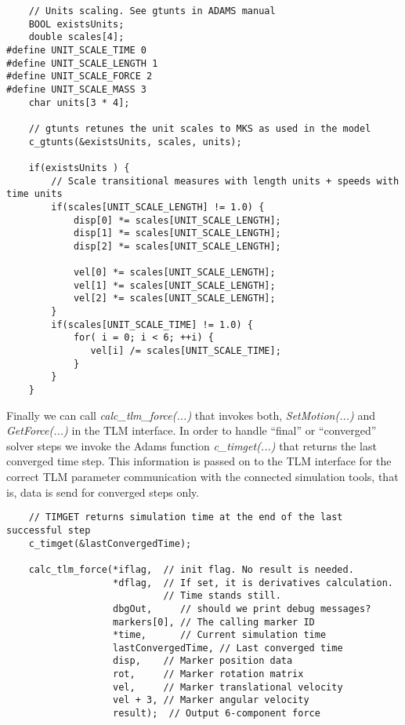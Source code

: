 {
\scriptsize
\begin{verbatim}
    // Units scaling. See gtunts in ADAMS manual
    BOOL existsUnits;
    double scales[4];
#define UNIT_SCALE_TIME 0
#define UNIT_SCALE_LENGTH 1
#define UNIT_SCALE_FORCE 2
#define UNIT_SCALE_MASS 3
    char units[3 * 4];

    // gtunts retunes the unit scales to MKS as used in the model
    c_gtunts(&existsUnits, scales, units);

    if(existsUnits ) {	
        // Scale transitional measures with length units + speeds with time units
        if(scales[UNIT_SCALE_LENGTH] != 1.0) {
            disp[0] *= scales[UNIT_SCALE_LENGTH];
            disp[1] *= scales[UNIT_SCALE_LENGTH];
            disp[2] *= scales[UNIT_SCALE_LENGTH];

            vel[0] *= scales[UNIT_SCALE_LENGTH];
            vel[1] *= scales[UNIT_SCALE_LENGTH];
            vel[2] *= scales[UNIT_SCALE_LENGTH];	
        }
        if(scales[UNIT_SCALE_TIME] != 1.0) {
            for( i = 0; i < 6; ++i) {
               vel[i] /= scales[UNIT_SCALE_TIME];
            }
        }
    }
\end{verbatim}
}

Finally we can call {\em calc\_tlm\_force(...)} that invokes both, {\em SetMotion(...)} and {\em GetForce(...)} in the TLM interface. 
In order to handle ``final'' or ``converged'' solver steps we invoke the Adams function {\em c\_timget(...)} that returns the last converged time step. 
This information is passed on to the TLM interface for the correct TLM parameter communication with the connected simulation tools, that is, data is send for converged steps only.

{
\scriptsize
\begin{verbatim}
    // TIMGET returns simulation time at the end of the last successful step
    c_timget(&lastConvergedTime);

    calc_tlm_force(*iflag,  // init flag. No result is needed.
                   *dflag,  // If set, it is derivatives calculation.
                            // Time stands still.
                   dbgOut,     // should we print debug messages?
                   markers[0], // The calling marker ID
                   *time,      // Current simulation time
                   lastConvergedTime, // Last converged time
                   disp,    // Marker position data
                   rot,     // Marker rotation matrix
                   vel,     // Marker translational velocity
                   vel + 3, // Marker angular velocity
                   result);  // Output 6-component force
\end{verbatim}
}

